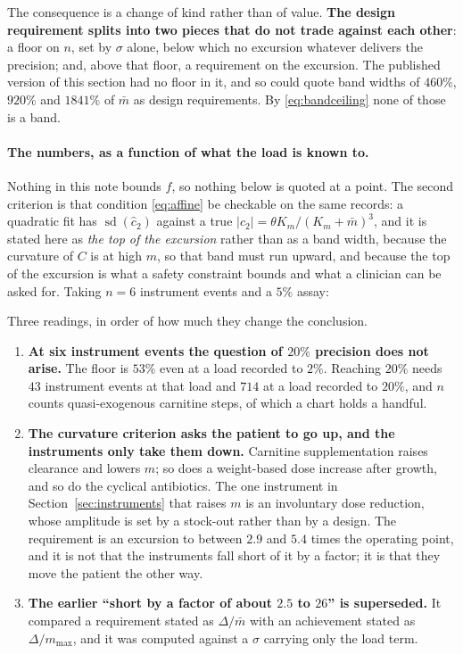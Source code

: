 The consequence is a change of kind rather than of value. \textbf{The design requirement
splits into two pieces that do not trade against each other}: a floor on $n$, set by
$\sigma$ alone, below which no excursion whatever delivers the precision; and, above that
floor, a requirement on the excursion. The published version of this section had no floor
in it, and so could quote band widths of $460\%$, $920\%$ and $1841\%$ of $\bar m$ as design
requirements. By \eqref{eq:bandceiling} none of those is a band.

\paragraph{The numbers, as a function of what the load is known to.} Nothing in this note
bounds $f$, so nothing below is quoted at a point. The second criterion is that condition
\eqref{eq:affine} be checkable on the same records: a quadratic fit has
$\operatorname{sd}(\hat c_2)$ against a true $|c_2| = \theta K_m/(K_m+\bar m)^3$, and it is
stated here as \emph{the top of the excursion} rather than as a band width, because the
curvature of $C$ is at high $m$, so that band must run upward, and because the top of the
excursion is what a safety constraint bounds and what a clinician can be asked for. Taking
$n = 6$ instrument events and a $5\%$ assay:

\begin{center}
\scriptsize

\end{center}

Three readings, in order of how much they change the conclusion.

\begin{enumerate}[leftmargin=*, itemsep=2pt]
\item \textbf{At six instrument events the question of $20\%$ precision does not arise.}
      The floor is $53\%$ even at a load recorded to $2\%$. Reaching $20\%$ needs $43$
      instrument events at that load and $714$ at a load recorded to $20\%$, and $n$ counts
      quasi-exogenous carnitine steps, of which a chart holds a handful.
\item \textbf{The curvature criterion asks the patient to go up, and the instruments only
      take them down.} Carnitine supplementation raises clearance and lowers $m$; so does a
      weight-based dose increase after growth, and so do the cyclical antibiotics. The one
      instrument in Section~\ref{sec:instruments} that raises $m$ is an involuntary dose
      reduction, whose amplitude is set by a stock-out rather than by a design. The
      requirement is an excursion to between $2.9$ and $5.4$ times the operating point, and
      it is not that the instruments fall short of it by a factor; it is that they move the
      patient the other way.
\item \textbf{The earlier ``short by a factor of about $2.5$ to $26$'' is superseded.} It
      compared a requirement stated as $\Delta/\bar m$ with an achievement stated as
      $\Delta/m_{\max}$, and it was computed against a $\sigma$ carrying only the load term.
\end{enumerate}

